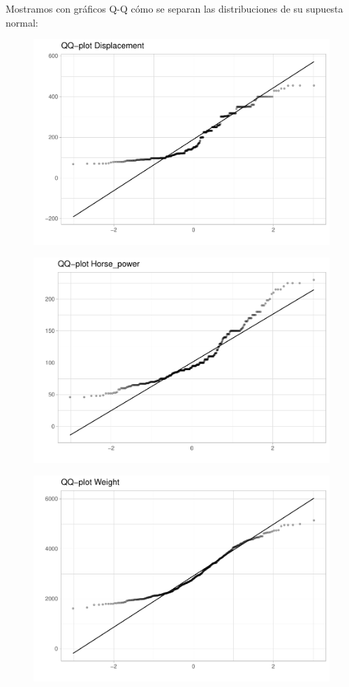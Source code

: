 \vspace{\baselineskip}
Mostramos con gráficos Q-Q cómo se separan las distribuciones de su supuesta normal:

\begin{figure}[H]\includegraphics[width=.9\linewidth]{img/EDA_files/figure-latex/unnamed-chunk-14-1} \caption{}\end{figure}

\begin{figure}[H]\includegraphics[width=.9\linewidth]{img/EDA_files/figure-latex/unnamed-chunk-14-2} \caption{}\end{figure}

\begin{figure}[H]\includegraphics[width=.9\linewidth]{img/EDA_files/figure-latex/unnamed-chunk-14-3} \caption{}\end{figure}

